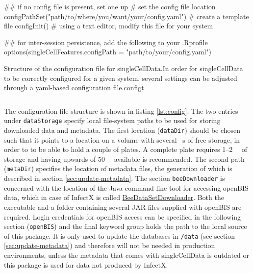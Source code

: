 \begin{rflow}
## if no config file is present, set one up
# set the config file location
configPathSet("path/to/where/you/want/your/config.yaml")
# create a template file
configInit()
# using a text editor, modify this file for your system

## for inter-session persistence, add the following to your .Rprofile
options(singleCellFeatures.configPath = "path/to/your/config.yaml")
\end{rflow}


\begin{rlisting}{Structure of the configuration file for singleCellData.}{In order for singleCellData to be correctly configured for a given system, several settings can be adjusted through a yaml-based configuration file.}{config}{t}
  \inputminted[fontsize=\footnotesize,linenos,numbersep=4pt,style=knitr]{yaml}{data/config.yaml}
\end{rlisting}

The configuration file structure is shown in listing \ref{lst:config}. The two entries under \texttt{dataStorage} specify local file-system paths to be used for storing downloaded data and metadata. The first location (\texttt{dataDir}) should be chosen such that it points to a location on a volume with several \si{\giga\byte}s of free storage, in order to to be able to hold a couple of plates. A complete plate requires 1--\SI{2}{\giga\byte} of storage and having upwards of \SI{50}{\giga\byte} available is recommended. The second path (\texttt{metaDir}) specifies the location of metadata files, the generation of which is described in section \ref{sec:update-metadata}. The section \texttt{beeDownloader} is concerned with the location of the Java command line tool for accessing openBIS data, which in case of InfectX is called \href{https://wiki.systemsx.ch/pages/viewpage.action?title=InfectX+Single+Cell+Data+Access&spaceKey=InfectXRTD}{BeeDataSetDownloader}. Both the executable and a folder containing several JAR-files supplied with openBIS are required. Login credentials for openBIS access can be specified in the following section (\texttt{openBIS}) and the final keyword group holds the path to the local source of this package. It is only used to update the databases in \texttt{/data} (see section \ref{sec:update-metadata}) and therefore will not be needed in production environments, unless the metadata that comes with singleCellData is outdated or this package is used for data not produced by InfectX.

